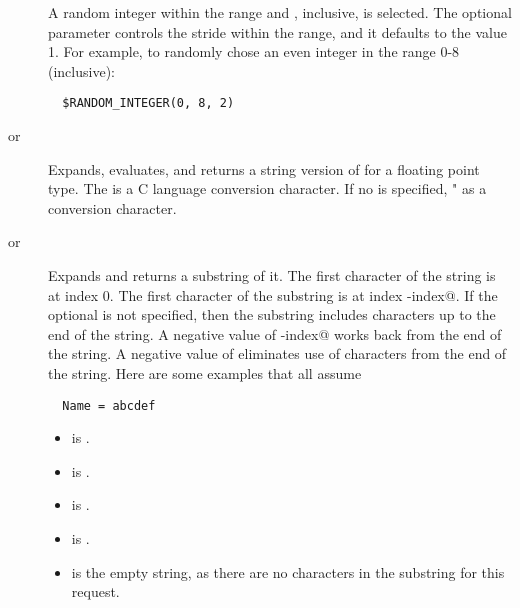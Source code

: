 \begin{description}
\item []
A random integer within the range \verb@min@ and \verb@max@, inclusive,
is selected.
The optional \verb@step@ parameter
controls the stride within the range, and it defaults to the value 1.
For example, to randomly chose an even integer in the range 0-8 (inclusive):
\begin{verbatim}
  $RANDOM_INTEGER(0, 8, 2)
\end{verbatim}

\item [
       or ]
Expands, evaluates, and returns a string version of 
 for a floating point type.
The  is a C language conversion character.
If no  is specified, \verb@"%16G"@ is used
as a conversion character.

\item [
       or ]
Expands \verb@name@ and returns a substring of it.
The first character of the string is at index 0.
The first character of the substring is at index \verb@start-index@.
If the optional \verb@length@ is not specified, 
then the substring includes characters up to the end of the string.
A negative value of  \verb@start-index@ works back from the end of the
string.
A negative value of \verb@length@ eliminates use of characters
from the end of the string.
Here are some examples that all assume
\begin{verbatim}
  Name = abcdef
\end{verbatim}
\begin{itemize}
  \item {} is .
  \item {} is .
  \item {} is .
  \item {} is .
  \item {} is the empty string, as there are
no characters in the substring for this request.
\end{itemize}

\end{description}
